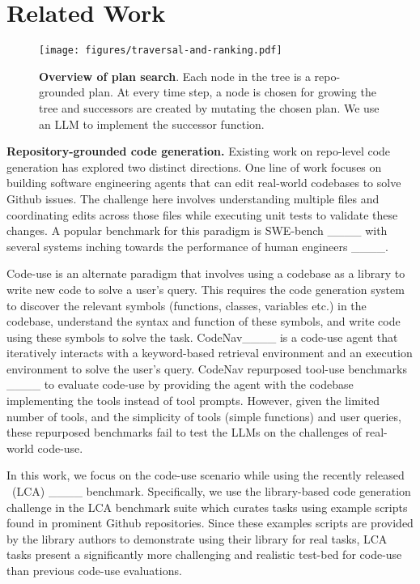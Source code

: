 \section{Related Work}
\begin{figure}
    \centering
    \texttt{[image: figures/traversal-and-ranking.pdf]}
    \vspace{-4mm}
    \caption{\textbf{Overview of plan search}. Each node in the tree is a repo-grounded plan. At every time step, a node is chosen for growing the tree and successors are created by mutating the chosen plan. We use an LLM to implement the successor function.}
    \label{fig:traversal-and-ranking}
\end{figure}
\noindent\textbf{Repository-grounded code generation.} Existing work on repo-level code generation has explored two distinct directions. One line of work focuses on building software engineering agents that can edit real-world codebases to solve Github issues. The challenge here involves understanding multiple files and coordinating edits across those files while executing unit tests to validate these changes. A popular benchmark for this paradigm is SWE-bench ____ with several systems inching towards the performance of human engineers ____. 

Code-use is an alternate paradigm that involves using a codebase as a library to write new code to solve a user's query. This requires the code generation system to discover the relevant symbols (functions, classes, variables etc.) in the codebase, understand the syntax and function of these symbols, and write code using these symbols to solve the task. CodeNav____ is a code-use agent that iteratively interacts with a keyword-based retrieval environment and an execution environment to solve the user's query. CodeNav repurposed tool-use benchmarks ____ to evaluate code-use by providing the agent with the codebase implementing the tools instead of tool prompts. However, given the limited number of tools, and the simplicity of tools (simple functions) and user queries, these repurposed benchmarks fail to test the LLMs on the challenges of real-world code-use. 

In this work, we focus on the code-use scenario while using the recently released \lca~(LCA) ____ benchmark. Specifically, we use the library-based code generation challenge in the LCA benchmark suite which curates tasks using example scripts found in prominent Github repositories. Since these examples scripts are provided by the library authors to demonstrate using their library for real tasks, LCA tasks present a significantly more challenging and realistic test-bed for code-use than previous code-use evaluations. 

